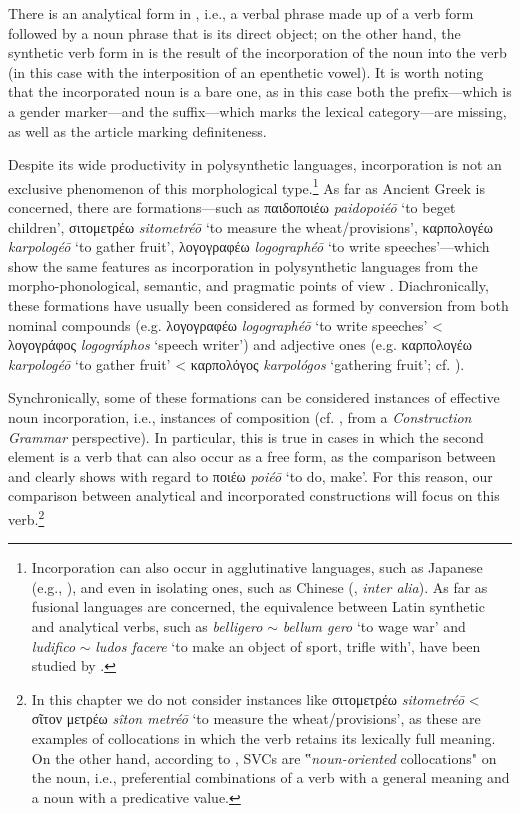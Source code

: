 \documentclass[output=paper,colorlinks,citecolor=brown]{langscibook}
\begin{document}
There is an analytical form in , i.e., a verbal phrase made up of a verb form followed by a noun phrase that is its direct object; on the other hand, the synthetic verb form in  is the result of the incorporation of the noun into the verb (in this case with the interposition of an epenthetic vowel). It is worth noting that the incorporated noun is a bare one, as in this case both the prefix---which is a gender marker---and the suffix---which marks the lexical category---are missing, as well as the article marking definiteness. 


Despite its wide productivity in polysynthetic languages, incorporation is not an exclusive phenomenon of this morphological type.\footnote{Incorporation can also occur in agglutinative languages, such as Japanese (e.g., \citealt[229]{Grimshaw1988}), and even in isolating ones, such as Chinese (\citealp{Luo2022}, \textit{inter alia}). As far as fusional languages are concerned, the equivalence between Latin synthetic and analytical verbs, such as \textit{belligero} $\sim$ \textit{bellum gero} `to wage war' and \textit{ludifico} $\sim$ \textit{ludos facere} `to make an object of sport, trifle with', have been studied by \citet{Banos2012,Banos2012a}.} As far as Ancient Greek is concerned, there are formations---such as παιδοποιέω \textit{paidopoiéō} `to beget children', σιτομετρέω \textit{sitometréō} `to measure the wheat/provisions', καρπολογέω \textit{karpologéō} `to gather fruit', λογογραφέω \textit{logographéō} `to write speeches'---which show the same features as incorporation in polysynthetic languages from the morpho-phonological, semantic, and pragmatic points of view \citep{Pompei2006}. Diachronically, these formations have usually been considered as formed by conversion from both nominal compounds (e.g. λογογραφέω \textit{logographéō} `to write speeches' < λογογράφος \textit{logográphos} `speech writer') and adjective ones (e.g. καρπολογέω \textit{karpologéō} `to gather fruit' < καρπολόγος \textit{karpológos} `gathering fruit'; cf. \citealp[301]{meissner2002nominal}).

Synchronically, some of these formations can be considered instances of effective noun incorporation, i.e., instances of composition (cf. \citealt{Pompei2012}, from a \textit{Construction Grammar} perspective). In particular, this is true in cases in which the second element is a verb that can also occur as a free form, as the comparison between  and  clearly shows with regard to ποιέω \textit{poiéō} `to do, make'. For this reason, our comparison between analytical and incorporated constructions will focus on this verb.\footnote{In this chapter we do not consider instances like σιτομετρέω \textit{sitometréō} < σῖτον μετρέω \textit{sîton metréō} `to measure the wheat/provisions', as these are examples of collocations in which the verb retains its lexically full meaning. On the other hand, according to \citet[205]{Jezek2016}, SVCs are ‟\textit{noun-oriented} collocations" on the noun, i.e., preferential combinations of a verb with a general meaning and a noun with a predicative value.}
\end{document}
